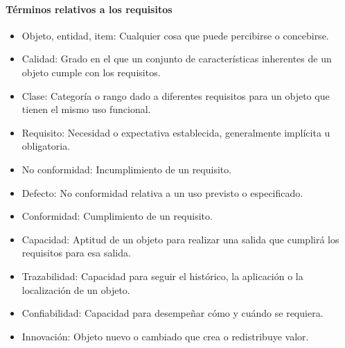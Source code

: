					\paragraph{Términos relativos a los requisitos}
						\begin{itemize}
							\item Objeto, entidad, item: Cualquier cosa que puede percibirse o concebirse.
							
							\item Calidad: Grado en el que un conjunto de características inherentes de un objeto cumple con los requisitos.
							
							\item Clase: Categoría o rango dado a diferentes requisitos para un objeto que tienen el mismo uso funcional.
							
							\item Requisito: Necesidad o expectativa establecida, generalmente implícita u obligatoria.
							
							\item No conformidad: Incumplimiento de un requisito.
							
							\item Defecto: No conformidad relativa a un uso previsto o especificado.
							
							\item Conformidad: Cumplimiento de un requisito.
							
							\item Capacidad: Aptitud de un objeto para realizar una salida que cumplirá los requisitos para esa salida.
							
							\item Trazabilidad: Capacidad para seguir el histórico, la aplicación o la localización de un objeto.
							
							\item Confiabilidad: Capacidad para desempeñar cómo y cuándo se requiera.
							
							\item Innovación: Objeto nuevo o cambiado que crea o redistribuye valor.
						\end{itemize}
					
					\newpage
					\thispagestyle{plain}
